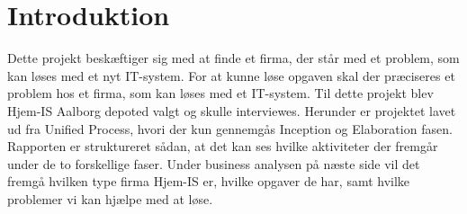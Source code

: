 \chapter{Introduktion}\label{ch:introduction}
Dette projekt beskæftiger sig med at finde et firma, der står med et problem, som kan løses med et nyt IT-system. For at kunne løse opgaven skal der præciseres et problem hos et firma, som kan løses med et IT-system. Til dette projekt blev Hjem-IS Aalborg depoted valgt og skulle interviewes. Herunder er projektet lavet ud fra Unified Process, hvori der kun gennemgås Inception og Elaboration fasen. Rapporten er struktureret sådan, at det kan ses hvilke aktiviteter der fremgår under de to forskellige faser. Under business analysen på næste side vil det fremgå hvilken type firma Hjem-IS er, hvilke opgaver de har, samt hvilke problemer vi kan hjælpe med at løse. 

